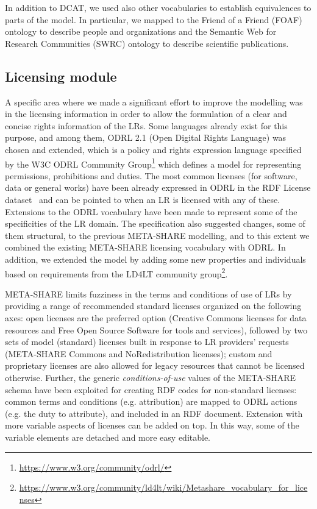 \documentclass{llncs}
\begin{document}
In addition to DCAT, we used also other vocabularies to establish equivalences to parts of the model. In particular, we mapped to the Friend of
a Friend (FOAF) ontology to describe people and organizations and the Semantic
Web for Research Communities (SWRC) ontology to describe scientific
publications.

\subsection{Licensing module}
\label{sec:licensing}

A specific area where we made a significant effort to improve the modelling was
in the licensing information in order to allow the formulation of a clear and
concise rights information of the LRs. 
Some languages already exist for this purpose, and among them, ODRL 2.1 (Open Digital Rights Language) was
chosen and extended, which is a policy and rights
expression language specified by the W3C ODRL Community
Group\footnote{\url{https://www.w3.org/community/odrl/}} which defines a model
for representing permissions, prohibitions and duties.
The most common licenses (for software, data or general works) have been already
expressed in ODRL in the RDF License dataset~\cite{rdflicense} and can be pointed to when an LR is licensed with any of these.
Extensions to the ODRL vocabulary have been made to represent some of the specificities
of the LR domain. The specification also suggested changes, some of them
structural, to the previous META-SHARE modelling, and to this extent we
combined the existing META-SHARE licensing vocabulary with ODRL.
In addition, we extended the model by adding some new properties and individuals
based on requirements from the LD4LT community group\footnote{\url{https://www.w3.org/community/ld4lt/wiki/Metashare\_vocabulary\_for\_licenses}}.

META-SHARE limits fuzziness in the terms and conditions of use of LRs by
providing a range of recommended standard licenses organized on the following axes: open licenses are the preferred option (Creative Commons licenses for data resources and Free Open Source Software for tools and
services), followed by two sets of model (standard) licenses built in response
to LR providers' requests (META-SHARE Commons and NoRedistribution licenses);
custom and proprietary licenses are also allowed for legacy
resources that cannot be licensed otherwise. 
Further, the generic \textit{conditions-of-use} values of the META-SHARE schema have been exploited for
creating RDF codes for non-standard licenses: common terms and conditions (e.g. attribution) are mapped to ODRL
actions (e.g. the duty to attribute), and included in an RDF
document. Extension with more variable aspects of licenses can be added on top. In this way, some of the variable
elements are detached and more easy editable. 
\end{document}
